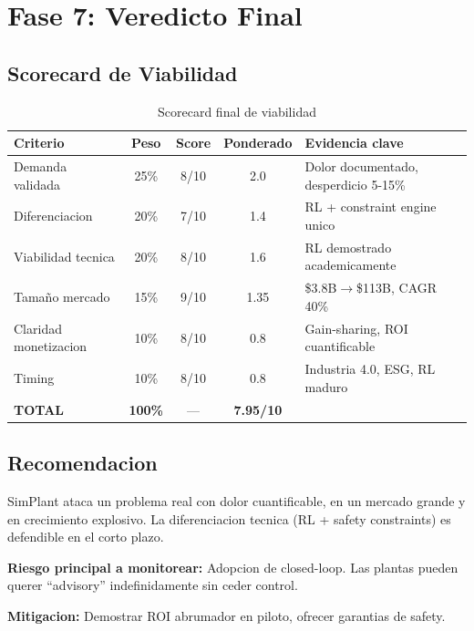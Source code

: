 \documentclass[11pt,a4paper]{article}
\begin{document}
\newpage
\section{Fase 7: Veredicto Final}

\subsection{Scorecard de Viabilidad}

\begin{table}[h]
\centering
\begin{tabular}{l c c c p{4cm}}
\toprule
\textbf{Criterio} & \textbf{Peso} & \textbf{Score} & \textbf{Ponderado} & \textbf{Evidencia clave} \\
\midrule
Demanda validada & 25\% & 8/10 & 2.0 & Dolor documentado, desperdicio 5-15\% \\
Diferenciacion & 20\% & 7/10 & 1.4 & RL + constraint engine unico \\
Viabilidad tecnica & 20\% & 8/10 & 1.6 & RL demostrado academicamente \\
Tamaño mercado & 15\% & 9/10 & 1.35 & \$3.8B$\rightarrow$\$113B, CAGR 40\% \\
Claridad monetizacion & 10\% & 8/10 & 0.8 & Gain-sharing, ROI cuantificable \\
Timing & 10\% & 8/10 & 0.8 & Industria 4.0, ESG, RL maduro \\
\midrule
\textbf{TOTAL} & \textbf{100\%} & --- & \textbf{7.95/10} & \\
\bottomrule
\end{tabular}
\caption{Scorecard final de viabilidad}
\end{table}

\subsection{Recomendacion}

\begin{veredictobox}[EJECUTAR]
SimPlant ataca un problema real con dolor cuantificable, en un mercado grande y en crecimiento explosivo. La diferenciacion tecnica (RL + safety constraints) es defendible en el corto plazo.

\textbf{Riesgo principal a monitorear:} Adopcion de closed-loop. Las plantas pueden querer ``advisory'' indefinidamente sin ceder control.

\textbf{Mitigacion:} Demostrar ROI abrumador en piloto, ofrecer garantias de safety.
\end{veredictobox}
\end{document}
